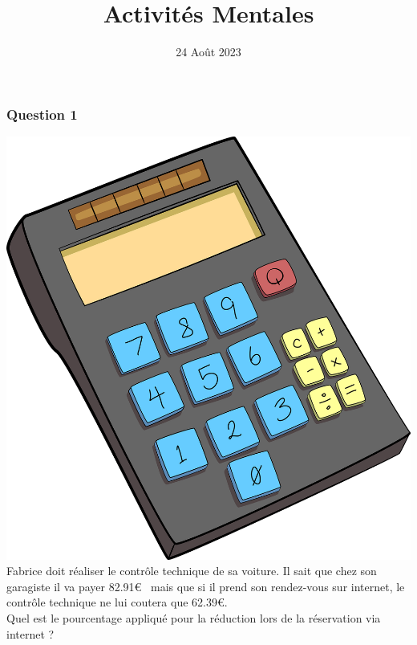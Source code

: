 \documentclass[15pt, mathserif]{beamer}
\title{Activités Mentales}
\date{24 Août 2023}
\begin{document}
\begin{frame}
    \titlepage
\end{frame}

\begin{frame} 
	\frametitle{Question 1}
\includegraphics[scale=0.01]{calculatrice}Fabrice doit réaliser le contrôle technique de sa voiture. Il sait que chez son garagiste il va payer 82.91\euro ~ mais que si il prend son rendez-vous sur internet, le contrôle technique ne lui coutera que  62.39\euro. \\ Quel est le pourcentage appliqué pour la réduction lors de la réservation via internet ? \end{frame}
\end{document}
